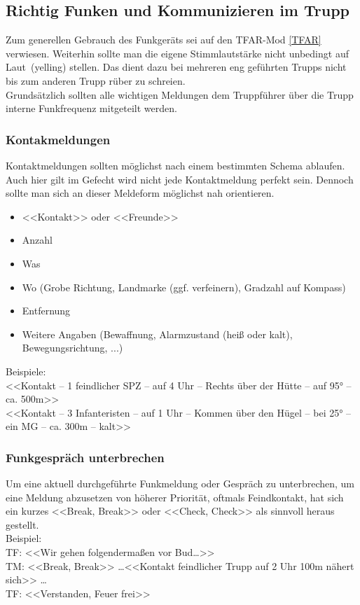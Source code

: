 \subsection{Richtig Funken und Kommunizieren im Trupp}
	Zum generellen Gebrauch des Funkgeräts sei auf den TFAR-Mod \autoref{TFAR} verwiesen. Weiterhin sollte man die eigene Stimmlautstärke nicht unbedingt auf \glqq Laut\grqq\, (\glqq yelling\grqq) stellen. Das dient dazu bei mehreren eng geführten Trupps nicht bis zum anderen Trupp rüber zu schreien.\\
	Grundsätzlich sollten alle wichtigen Meldungen dem Truppführer über die Trupp interne Funkfrequenz mitgeteilt werden.

\subsubsection{Kontakmeldungen}
	Kontaktmeldungen  sollten möglichst nach einem bestimmten Schema ablaufen.  Auch hier gilt im Gefecht wird nicht jede Kontaktmeldung perfekt sein. Dennoch sollte man sich an dieser Meldeform möglichst nah orientieren.
	\begin{itemize}
		\item <<Kontakt>> oder <<Freunde>>
		\item Anzahl 
		\item Was
		\item Wo (Grobe Richtung, Landmarke (ggf. verfeinern), Gradzahl auf Kompass) 
		\item Entfernung
		\item Weitere Angaben (Bewaffnung, Alarmzustand (heiß oder kalt), Bewegungsrichtung, ...)
	\end{itemize}

	Beispiele:\\
	<<Kontakt -- 1 feindlicher \acs{SPZ} -- auf 4 Uhr -- Rechts über der Hütte -- auf 95° -- ca. 500m>> \\
	<<Kontakt -- 3 Infanteristen -- auf 1 Uhr -- Kommen über den Hügel -- bei 25° -- ein \acs{MG} -- ca. 300m -- kalt>>

\subsubsection{Funkgespräch unterbrechen}
	Um eine aktuell durchgeführte Funkmeldung oder Gespräch zu unterbrechen, um eine Meldung abzusetzen von höherer Priorität, oftmals Feindkontakt, hat sich ein kurzes <<Break, Break>> oder <<Check, Check>> als sinnvoll heraus gestellt. \\
	Beispiel: \\
	TF: <<Wir gehen folgendermaßen vor Bud…>>  \\
	TM: <<Break, Break>> \dots <<Kontakt feindlicher Trupp auf 2 Uhr  100m nähert sich>> \dots  \\
	TF: <<Verstanden, Feuer frei>>

